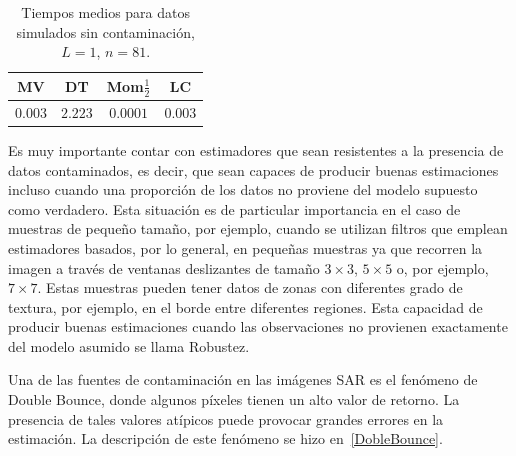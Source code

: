 \begin{table}[htb]
	\centering
	\begin{tabular}{cccc}
		\toprule
		MV& DT& Mom$\frac{1}{2}$ & LC \\
		\midrule
		$0.003$& $2.223$ & $0.0001$ &$0.003$ \\
		\bottomrule
	\end{tabular}
\caption{\label{tablaDeTiemposmedios}\small Tiempos medios para datos simulados sin contaminación, $L=1$, $n=81$. }
\end{table}

Es muy importante contar con estimadores que sean resistentes a la presencia de datos contaminados, es decir, que sean capaces de producir buenas estimaciones incluso cuando una proporción de los datos no proviene del modelo supuesto como verdadero. Esta situación es de particular importancia en el caso de muestras de pequeño tamaño, por ejemplo, cuando se utilizan filtros que emplean estimadores basados, por lo general, en pequeñas muestras ya que recorren la imagen a través de ventanas deslizantes de tamaño $3 \times 3$, $5 \times 5$ o, por ejemplo, $7 \times 7$. Estas muestras pueden tener datos de zonas con diferentes grado de textura, por ejemplo, en el borde entre diferentes regiones. Esta capacidad de producir buenas estimaciones cuando las observaciones no provienen exactamente del modelo asumido se llama Robustez.

Una de las fuentes de contaminación en las imágenes SAR es el fenómeno de Double Bounce, donde algunos píxeles tienen un alto valor de retorno.  La presencia de tales valores atípicos puede provocar grandes errores en la estimación. La descripción de este fenómeno se hizo en~\ref{DobleBounce}.

